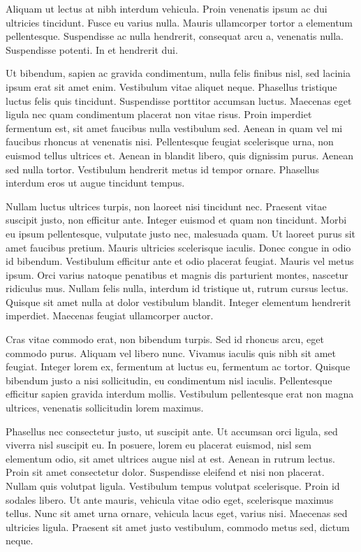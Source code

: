 \documentclass[11pt]{article}
\begin{document}
    Aliquam ut lectus at nibh interdum vehicula. Proin venenatis ipsum ac dui ultricies tincidunt. Fusce eu varius nulla. Mauris ullamcorper tortor a elementum pellentesque. Suspendisse ac nulla hendrerit, consequat arcu a, venenatis nulla. Suspendisse potenti. In et hendrerit dui.

    Ut bibendum, sapien ac gravida condimentum, nulla felis finibus nisl, sed lacinia ipsum erat sit amet enim. Vestibulum vitae aliquet neque. Phasellus tristique luctus felis quis tincidunt. Suspendisse porttitor accumsan luctus. Maecenas eget ligula nec quam condimentum placerat non vitae risus. Proin imperdiet fermentum est, sit amet faucibus nulla vestibulum sed. Aenean in quam vel mi faucibus rhoncus at venenatis nisi. Pellentesque feugiat scelerisque urna, non euismod tellus ultrices et. Aenean in blandit libero, quis dignissim purus. Aenean sed nulla tortor. Vestibulum hendrerit metus id tempor ornare. Phasellus interdum eros ut augue tincidunt tempus.

    Nullam luctus ultrices turpis, non laoreet nisi tincidunt nec. Praesent vitae suscipit justo, non efficitur ante. Integer euismod et quam non tincidunt. Morbi eu ipsum pellentesque, vulputate justo nec, malesuada quam. Ut laoreet purus sit amet faucibus pretium. Mauris ultricies scelerisque iaculis. Donec congue in odio id bibendum. Vestibulum efficitur ante et odio placerat feugiat. Mauris vel metus ipsum. Orci varius natoque penatibus et magnis dis parturient montes, nascetur ridiculus mus. Nullam felis nulla, interdum id tristique ut, rutrum cursus lectus. Quisque sit amet nulla at dolor vestibulum blandit. Integer elementum hendrerit imperdiet. Maecenas feugiat ullamcorper auctor.

    Cras vitae commodo erat, non bibendum turpis. Sed id rhoncus arcu, eget commodo purus. Aliquam vel libero nunc. Vivamus iaculis quis nibh sit amet feugiat. Integer lorem ex, fermentum at luctus eu, fermentum ac tortor. Quisque bibendum justo a nisi sollicitudin, eu condimentum nisl iaculis. Pellentesque efficitur sapien gravida interdum mollis. Vestibulum pellentesque erat non magna ultrices, venenatis sollicitudin lorem maximus.

    Phasellus nec consectetur justo, ut suscipit ante. Ut accumsan orci ligula, sed viverra nisl suscipit eu. In posuere, lorem eu placerat euismod, nisl sem elementum odio, sit amet ultrices augue nisl at est. Aenean in rutrum lectus. Proin sit amet consectetur dolor. Suspendisse eleifend et nisi non placerat. Nullam quis volutpat ligula. Vestibulum tempus volutpat scelerisque. Proin id sodales libero. Ut ante mauris, vehicula vitae odio eget, scelerisque maximus tellus. Nunc sit amet urna ornare, vehicula lacus eget, varius nisi. Maecenas sed ultricies ligula. Praesent sit amet justo vestibulum, commodo metus sed, dictum neque.
\end{document}
